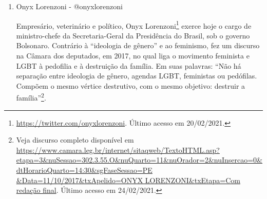 \documentclass[
	12pt,				%
	openright,			%
	twoside,			%
	a4paper,			%
	english,			%
	brazil				%
	]{abntex2}
\begin{document}
\begin{anexosenv}
\begin{enumerate}
 \begin{figure}[!htbp]
    \centering
    \texttt{[image: oc\_2.png]}
    \caption{Postagem no Twitter de Olavo de Carvalho. Disponível em \url{https://twitter.com/OdeCarvalho/status/826866916887257089}. Último acesso em 24/02/2021.}
 \end{figure}
 
 \begin{figure}[!htbp]
    \centering
    \texttt{[image: oc\_4.png]}
    \caption{Postagem no Twitter de Olavo de Carvalho. Disponível em \url{https://twitter.com/OdeCarvalho/status/795769595231698945}. Último acesso em 24/02/2021.}
 \end{figure}
 
 \begin{figure}[!htbp]
    \centering
    \texttt{[image: oc\_5.png]}
    \caption{Postagem no Twitter de Olavo de Carvalho. Disponível em \url{https://twitter.com/OdeCarvalho/status/853381631461163009}. Último acesso em 24/02/2021.}
 \end{figure}
 
 \begin{figure}[!htbp]
    \centering
    \texttt{[image: oc\_6.png]}
    \caption{Postagem no Twitter de Olavo de Carvalho. Disponível em \url{https://twitter.com/OdeCarvalho/status/907765691880796160}. Último acesso em 24/02/2021.}
 \end{figure}
 
 
  
 \item Onyx Lorenzoni - @onyxlorenzoni
 
 Empresário, veterinário e político, Onyx Lorenzoni\footnote{\url{https://twitter.com/onyxlorenzoni}. Último acesso em 20/02/2021.} exerce hoje o cargo de ministro-chefe da Secretaria-Geral da Presidência do Brasil, sob o governo Bolsonaro. Contrário à ``ideologia de gênero'' e ao feminismo, fez um discurso na Câmara dos deputados, em 2017, no qual liga o movimento feminista e LGBT à pedofilia e à destruição da família. Em suas palavras: ``Não há separação entre ideologia de gênero, agendas LGBT, feministas ou pedófilas. Compõem o mesmo vértice destrutivo, com o mesmo objetivo: destruir a família''\footnote{Veja discurso completo disponível em \url{https://www.camara.leg.br/internet/sitaqweb/TextoHTML.asp?etapa=3&nuSessao=302.3.55.O&nuQuarto=11&nuOrador=2&nuInsercao=0&dtHorarioQuarto=14:30&sgFaseSessao=PE        &Data=11/10/2017&txApelido=ONYX LORENZONI&txEtapa=Com redação final}. Último acesso em 24/02/2021.}.
  

\end{enumerate}
\end{anexosenv}
\end{document}
